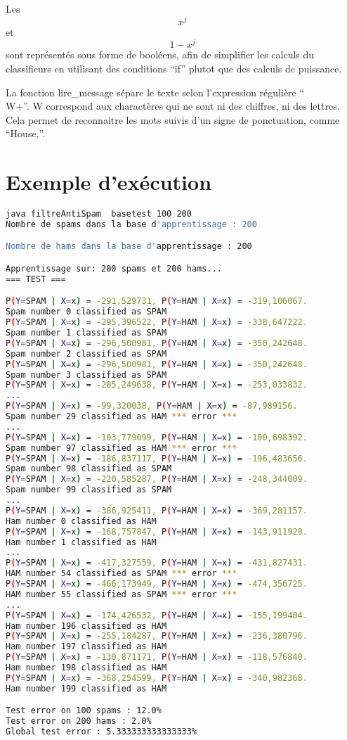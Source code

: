 \documentclass[a4paper, 11pt]{article}
\begin{document}
Les \[ x^j \] et \[ 1- x^j \] sont représentés sous forme de booléens, afin de simplifier les calculs du classifieurs en utilisant des conditions ``if'' plutot que des calculs de puissance.

La fonction lire\_message sépare le texte selon l'expression régulière ``\\ W+''. W correspond aux charactères qui ne sont ni des chiffres, ni des lettres. Cela permet de reconnaitre les mots suivis d'un signe de ponctuation, comme ``House,''.

\section{Exemple d'exécution}

\begin{lstlisting}[language=bash]
java filtreAntiSpam  basetest 100 200
Nombre de spams dans la base d'apprentissage : 200

Nombre de hams dans la base d'apprentissage : 200

Apprentissage sur: 200 spams et 200 hams...
=== TEST ===

P(Y=SPAM | X=x) = -291,529731, P(Y=HAM | X=x) = -319,106067.
Spam number 0 classified as SPAM
P(Y=SPAM | X=x) = -295,396522, P(Y=HAM | X=x) = -338,647222.
Spam number 1 classified as SPAM
P(Y=SPAM | X=x) = -296,500981, P(Y=HAM | X=x) = -350,242648.
Spam number 2 classified as SPAM
P(Y=SPAM | X=x) = -296,500981, P(Y=HAM | X=x) = -350,242648.
Spam number 3 classified as SPAM
P(Y=SPAM | X=x) = -205,249638, P(Y=HAM | X=x) = -253,033832.
...
P(Y=SPAM | X=x) = -99,320038, P(Y=HAM | X=x) = -87,989156.
Spam number 29 classified as HAM *** error ***
...
P(Y=SPAM | X=x) = -103,779099, P(Y=HAM | X=x) = -100,698392.
Spam number 97 classified as HAM *** error ***
P(Y=SPAM | X=x) = -186,837117, P(Y=HAM | X=x) = -196,483656.
Spam number 98 classified as SPAM
P(Y=SPAM | X=x) = -220,585287, P(Y=HAM | X=x) = -248,344009.
Spam number 99 classified as SPAM
...
P(Y=SPAM | X=x) = -386,925411, P(Y=HAM | X=x) = -369,281157.
Ham number 0 classified as HAM
P(Y=SPAM | X=x) = -168,757847, P(Y=HAM | X=x) = -143,911920.
Ham number 1 classified as HAM
...
P(Y=SPAM | X=x) = -417,327559, P(Y=HAM | X=x) = -431,827431.
HAM number 54 classified as SPAM *** error ***
P(Y=SPAM | X=x) = -466,173949, P(Y=HAM | X=x) = -474,356725.
HAM number 55 classified as SPAM *** error ***
...
P(Y=SPAM | X=x) = -174,426532, P(Y=HAM | X=x) = -155,199404.
Ham number 196 classified as HAM
P(Y=SPAM | X=x) = -255,184287, P(Y=HAM | X=x) = -236,380796.
Ham number 197 classified as HAM
P(Y=SPAM | X=x) = -130,871171, P(Y=HAM | X=x) = -118,576840.
Ham number 198 classified as HAM
P(Y=SPAM | X=x) = -368,254599, P(Y=HAM | X=x) = -340,982368.
Ham number 199 classified as HAM

Test error on 100 spams : 12.0%
Test error on 200 hams : 2.0%
Global test error : 5.333333333333333%


\end{lstlisting}
\end{document}
